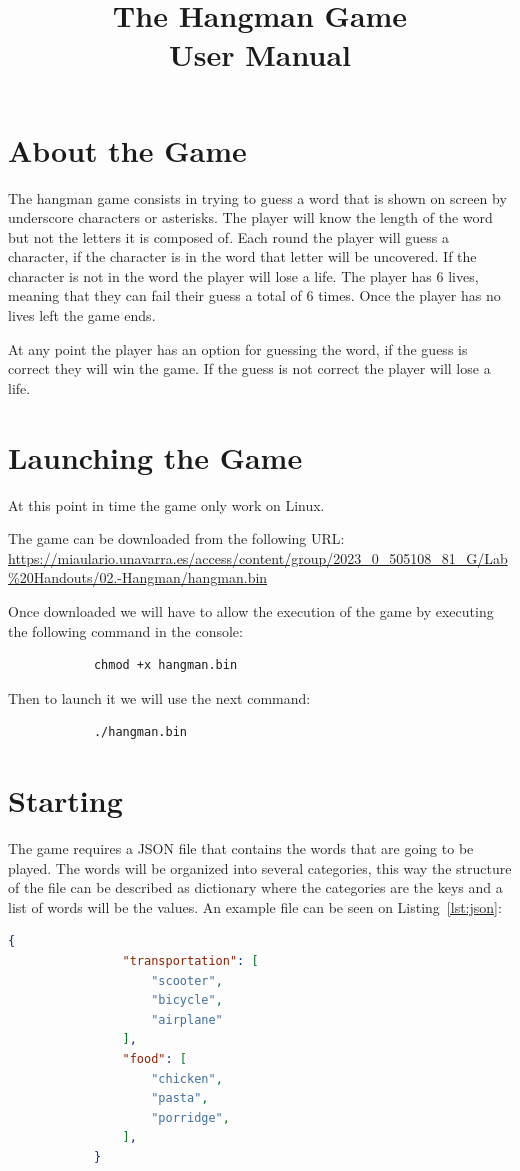 \documentclass[10pt,a4paper]{article}
\title{The Hangman Game\\User Manual}
\author{}
\date{}
\begin{document}
	\maketitle
	\section{About the Game}
		The hangman game consists in trying to guess a word that is shown on screen by underscore characters or asterisks. 
		The player will know the length of the word but not the letters it is composed of.
		Each round the player will guess a character, if the character is in the word that letter will be uncovered.
		If the character is not in the word the player will lose a life. 
		The player has 6 lives, meaning that they can fail their guess a total of 6 times.
		Once the player has no lives left the game ends.
		
		At any point the player has an option for guessing the word, if the guess is correct they will win the game.
		If the guess is not correct the player will lose a life.
		
	\section{Launching the Game}
		At this point in time the game only work on Linux.
	
		The game can be downloaded from the following URL:\\ \href{https://miaulario.unavarra.es/access/content/group/2023\_0\_505108\_81\_G/Lab\%20Handouts/02.-Hangman/hangman.bin}{\url{https://miaulario.unavarra.es/access/content/group/2023\_0\_505108\_81\_G/Lab\%20Handouts/02.-Hangman/hangman.bin}}
		
		Once downloaded we will have to allow the execution of the game by executing the following command in the console:
		\begin{verbatim}
			chmod +x hangman.bin
		\end{verbatim}
		
		Then to launch it we will use the next command:
		\begin{verbatim}
			./hangman.bin
		\end{verbatim}
	
	\section{Starting}
		The game requires a JSON file that contains the words that are going to be played.
		The words will be organized into several categories, this way the structure of the file can be described as dictionary where the categories are the keys and a list of words will be the values.
		An example file can be seen on Listing~\ref{lst:json}:
		\newpage
		\begin{lstlisting}[language=json, caption={JSON file example}, captionpos=b, label=lst:json]
			{
				"transportation": [
					"scooter",
					"bicycle",
					"airplane"
				],
				"food": [
					"chicken",
					"pasta",
					"porridge",
				],
			}
		\end{lstlisting}
		
\end{document}
